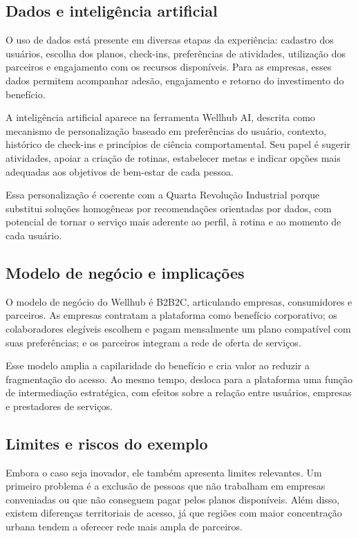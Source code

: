 \documentclass[12pt,a4paper]{article}
\begin{document}
\subsection{Dados e inteligência artificial}
\label{sec:orge3e446a}

O uso de dados está presente em diversas etapas da experiência: cadastro dos usuários, escolha dos planos, check-ins, preferências de atividades, utilização dos parceiros e engajamento com os recursos disponíveis. Para as empresas, esses dados permitem acompanhar adesão, engajamento e retorno do investimento do benefício.

A inteligência artificial aparece na ferramenta Wellhub AI, descrita como mecanismo de personalização baseado em preferências do usuário, contexto, histórico de check-ins e princípios de ciência comportamental. Seu papel é sugerir atividades, apoiar a criação de rotinas, estabelecer metas e indicar opções mais adequadas aos objetivos de bem-estar de cada pessoa.

Essa personalização é coerente com a Quarta Revolução Industrial porque substitui soluções homogêneas por recomendações orientadas por dados, com potencial de tornar o serviço mais aderente ao perfil, à rotina e ao momento de cada usuário.

\subsection{Modelo de negócio e implicações}
\label{sec:org94abe18}

O modelo de negócio do Wellhub é B2B2C, articulando empresas, consumidores e parceiros. As empresas contratam a plataforma como benefício corporativo; os colaboradores elegíveis escolhem e pagam mensalmente um plano compatível com suas preferências; e os parceiros integram a rede de oferta de serviços.

Esse modelo amplia a capilaridade do benefício e cria valor ao reduzir a fragmentação do acesso. Ao mesmo tempo, desloca para a plataforma uma função de intermediação estratégica, com efeitos sobre a relação entre usuários, empresas e prestadores de serviços.

\subsection{Limites e riscos do exemplo}
\label{sec:org39b3800}

Embora o caso seja inovador, ele também apresenta limites relevantes. Um primeiro problema é a exclusão de pessoas que não trabalham em empresas conveniadas ou que não conseguem pagar pelos planos disponíveis. Além disso, existem diferenças territoriais de acesso, já que regiões com maior concentração urbana tendem a oferecer rede mais ampla de parceiros.
\end{document}
